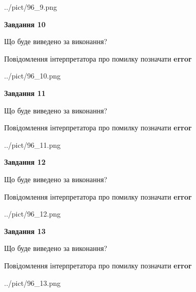 \documentclass[11pt, ukrainian]{article}
\begin{document}
{\begin {large}
\begin{center}
	{../pict/96_9.png}
\end{center}
\newpage

{\begin {center}\textbf{Завдання 10}\end {center}}\par
Що буде виведено за виконання? \par
Повідомлення інтерпретатора про помилку позначати \textbf{error}

\begin{center}
	{../pict/96_10.png}
\end{center}
\newpage

{\begin {center}\textbf{Завдання 11}\end {center}}\par
Що буде виведено за виконання? \par
Повідомлення інтерпретатора про помилку позначати \textbf{error}

\begin{center}
	{../pict/96_11.png}
\end{center}
\newpage

{\begin {center}\textbf{Завдання 12}\end {center}}\par
Що буде виведено за виконання? \par
Повідомлення інтерпретатора про помилку позначати \textbf{error}

\begin{center}
	{../pict/96_12.png}
\end{center}
\newpage

{\begin {center}\textbf{Завдання 13}\end {center}}\par
Що буде виведено за виконання? \par
Повідомлення інтерпретатора про помилку позначати \textbf{error}

\begin{center}
	{../pict/96_13.png}
\end{center}
\newpage


\end{large}}
\end{document}
